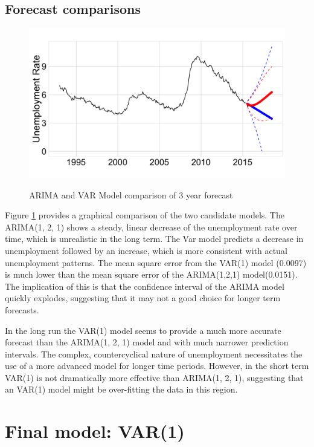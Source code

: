 \documentclass[twoside,twocolumn]{article}
\begin{document}
 \subsection{Forecast comparisons}
    \begin{figure}[htb]
    	\centering
     	\caption{ARIMA and VAR Model comparison of 3 year  forecast}
     	\includegraphics[width=\linewidth]{images/arimavarforecast}
     	\label{fig:arimavarforecast}
 \end{figure}
 
 
      Figure \ref{fig:arimavarforecast} provides a graphical comparison of the two candidate models.  The ARIMA(1, 2, 1) shows a steady, linear decrease of the unemployment rate over time, which is unrealistic in the long term.  The Var model predicts a decrease in unemployment followed by an increase, which is more consistent with actual unemployment patterns. The mean square error from the VAR(1) model (0.0097) is much lower than the mean square error of the ARIMA(1,2,1) model(0.0151). The implication of this is that  the confidence interval of the ARIMA model quickly explodes, suggesting that it may not a good choice for longer term forecasts.
      
In the long run the VAR(1) model seems to provide a much more accurate forecast than the ARIMA(1, 2, 1) model and with much narrower prediction intervals. The complex, countercyclical nature of unemployment necessitates the use of a more advanced model for longer time periods. However, in the short term VAR(1) is not dramatically more effective than ARIMA(1, 2, 1), suggesting that an VAR(1) model might be over-fitting the data in this region.


 \section{Final model: VAR(1)}
\end{document}

